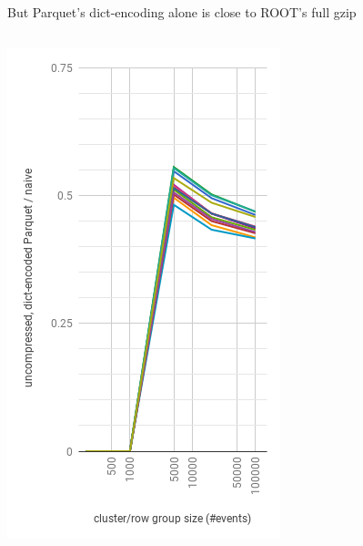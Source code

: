 \documentclass[aspectratio=169]{beamer}
\begin{document}
\begin{frame}{But Parquet's dict-encoding alone is close to ROOT's full gzip}
\begin{columns}
\begin{center}
\includegraphics[width=\linewidth]{parquet-dict.png}
\end{center}
\end{columns}
\end{frame}
\end{document}
